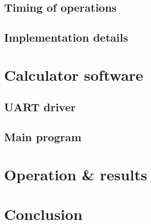 \documentclass[12pt,a4paper]{article}
\begin{document}
\subsection{Timing of operations}

\subsection{Implementation details}


\section{Calculator software}

\subsection{UART driver}

\subsection{Main program}


\section{Operation \& results}


\section{Conclusion}
\end{document}

